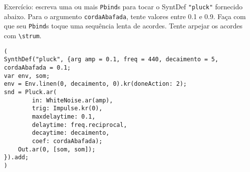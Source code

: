 Exercício: escreva uma ou mais \texttt{Pbind}s para tocar o SyntDef \texttt{"pluck"} fornecido abaixo. Para o argumento \texttt{cordaAbafada}, tente valores entre  0.1 e 0.9. Faça com que seu \texttt{Pbind}s toque uma sequência lenta de acordes. Tente arpejar os acordes com \texttt{\textbackslash strum}.

\begin{lstlisting}[style=SuperCollider-IDE, basicstyle=\scttfamily\footnotesize]
(
SynthDef("pluck", {arg amp = 0.1, freq = 440, decaimento = 5, cordaAbafada = 0.1;
var env, som;
env = Env.linen(0, decaimento, 0).kr(doneAction: 2);
snd = Pluck.ar(
        in: WhiteNoise.ar(amp),
        trig: Impulse.kr(0),
        maxdelaytime: 0.1,
        delaytime: freq.reciprocal,
        decaytime: decaimento,
        coef: cordaAbafada);
    Out.ar(0, [som, som]);
}).add;
)
\end{lstlisting}
